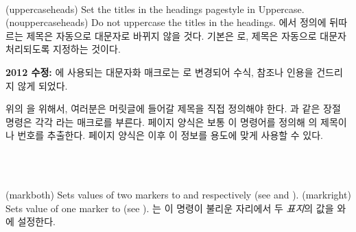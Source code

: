\begin{plainlist}
\begin{syntax}
\cmd{\uppercaseheads} \cmd{\nouppercaseheads}  \\
\end{syntax}
\glossary(uppercaseheads)%
  {}%
  {Set the titles in the headings pagestyle in Uppercase.}
\glossary(nouppercaseheads)%
  {}%
  {Do not uppercase the titles in the headings.}
에서 \cmd{\nouppercaseheads} 정의에 뒤따르는 제목은 자동으로
대문자로 바뀌지 않을 것다.
기본은 \cmd{\uppercaseheads}로, 제목은 자동으로 대문자 처리되도록 지정하는
것이다.

\textbf{2012 수정:} 에 사용되는 대문자화 매크로는
로 변경되어 수식, 참조나 인용을 건드리지 않게 되었다.

위의 을 위해서, 여러분은 머릿글에 들어갈
제목을 직접 정의해야 한다.
과 같은 장절 명령은 각각 라는 매크로를 부른다.
페이지 양식은 보통 이 명령어를 정의해 의 제목이나 번호를 추출한다.
페이지 양식은 이후 이 정보를 용도에 맞게 사용할 수 있다.

\begin{syntax}
\cmd{\markboth} \\
\cmd{\markright} \\
\end{syntax}
\glossary(markboth)%
  {}%
  {Sets values of two markers to  and  respectively
   (see  and ).}
\glossary(markright)%
  {}%
  {Sets value of one marker to  (see ).}
\cmd{\markboth}는 이 명령이 불리운 자리에서 두 \emph{표지}의
값을 와 에 설정한다.


\end{plainlist}
